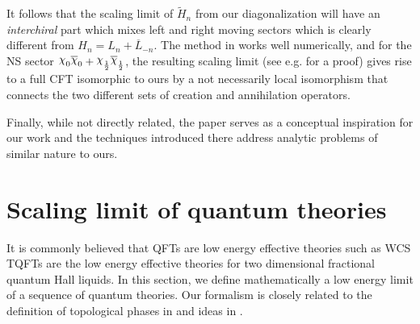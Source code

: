 \documentclass[twoside,11pt,titlepage]{amsart}
\renewcommand{\=}[1]{\stackrel{#1}{=}} %
\theoremstyle{definition}
\theoremstyle{remark}
\DeclareRobustCommand{\rchi}{{\mathpalette\irchi\relax}}
\newcommand{\irchi}[2]{\raisebox{\depth}{$#1\chi$}}
\begin{document}
It follows that the scaling limit of $\widetilde{H}_n$ from our diagonalization will have an \textit{interchiral} part which mixes left and right moving sectors which is clearly different from $H_n=L_n+\overline{L}_{-n}$. The method in \cite{milsted2017extraction} works well numerically, and for the NS sector  $\rchi_0\overline{\rchi}_0+\rchi_\frac{1}{2}\overline{\rchi}_\frac{1}{2}$, the resulting scaling limit (see e.g. \cite{koo1994representations} for a proof) gives rise to a full CFT isomorphic to ours by a not necessarily local isomorphism that connects the two different sets of creation and annihilation operators.

Finally, while not directly related, the paper \cite{konig2017matrix} serves as a conceptual inspiration for our work and the techniques introduced there address analytic problems of similar nature to ours.

\section{Scaling limit of quantum theories}\label{2.}

It is commonly believed that QFTs are low energy effective theories such as WCS TQFTs are the low energy effective theories for two dimensional fractional quantum Hall liquids.  In this section, we define mathematically a low energy limit of a sequence of quantum theories.  Our formalism is closely related to the definition of topological phases in \cite{RW17} and ideas in \cite{gainutdinov2013continuum}.  
\end{document}

